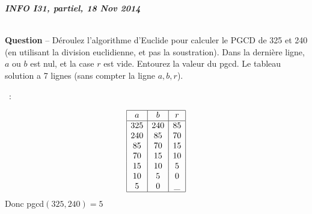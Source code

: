 \documentclass[12pt]{article}
\newcounter{QNumber}
\newcommand{\Question}[2][ ]{
 \stepcounter{QNumber}
  \noindent\textbf{Question \theQNumber} --
  #2~#1}
\begin{document}
  \begin{center}
    \bfseries\LARGE
    \textit{INFO I31, partiel, 18 Nov 2014}\large
  \end{center}
  \sffamily
\setlength\parskip{0.2cm} 





~\\

\Question{D\'eroulez l'algorithme d'Euclide pour calculer le PGCD de 325 et 240 (en utilisant la division euclidienne, et pas la soustration).
Dans la dernière ligne, $a$ ou $b$ est nul, et la case  $r$ est vide.
Entourez la valeur du pgcd. Le tableau solution  a 7 lignes (sans compter la ligne $a, b, r$).}

~:

$$
\begin{array}{|c|c|c|}
\hline
\; a\; & \; b\; & \; r\; \\
\hline
325 & 240 & 85 \\
240 &  85 & 70 \\
85  &  70 & 15 \\
70  &  15 & 10 \\
15  &  10 & 5 \\
10  &  5  & 0 \\
5   &  0  & \_  \\  
\hline
\end{array}
$$
Donc pgcd$(325, 240)=5$
\end{document}

